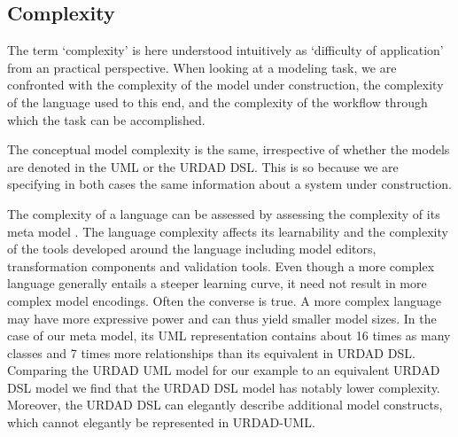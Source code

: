 \subsection{Complexity}
The term `complexity' is here understood intuitively as 
`difficulty of application' from an practical perspective. 
When looking at a modeling task, we are confronted with the 
complexity of the model under construction, the complexity 
of the language used to this end, and the complexity of the 
workflow through which the task can be accomplished.

The conceptual model complexity is the same, irrespective 
of whether the models are denoted in the UML or the URDAD 
DSL. This is so because we are specifying in both cases
the same information about a system under construction.

The complexity of a language can be assessed by assessing 
the complexity of its meta model \cite{mohagheghi_evaluating_2007}. 
The language complexity affects its learnability and the complexity 
of the tools developed around the language including model editors, 
transformation components and validation tools. Even though a more 
complex language generally entails a steeper learning curve, it need 
not result in more complex model encodings. Often the converse is true. 
A more complex language may have more expressive power and can thus 
yield smaller model sizes. In the case of our meta model, its UML 
representation contains about 16 times as many classes and 7 times 
more relationships than its equivalent in URDAD DSL. Comparing the 
URDAD UML model for our example to an equivalent URDAD DSL model 
we find that the URDAD DSL model has notably lower complexity. 
Moreover, the URDAD DSL can elegantly describe additional model 
constructs, which cannot elegantly be represented in URDAD-UML.



